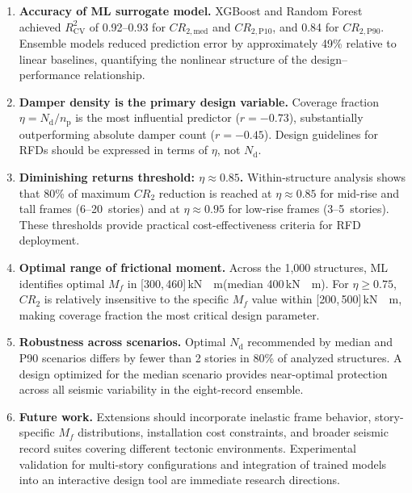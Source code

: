 \documentclass[preprint,12pt,authoryear]{elsarticle}
\newcommand{\CR}[1]{CR_{2,\text{#1}}}
\newcommand{\Rsq}{R^{2}_{\mathrm{CV}}}
\newcommand{\nd}{N_{\mathrm{d}}}
\newcommand{\np}{n_{\mathrm{p}}}              %
\newcommand{\etad}{\eta}
\newcommand{\Mf}{M_{\!f}}
\newcommand{\KM}{\,\si{kN{\cdot}m}}
\begin{document}
\begin{enumerate}

\item \textbf{Accuracy of ML surrogate model.}
XGBoost and Random Forest achieved $\Rsq$ of 0.92--0.93 for $\CR{med}$ and $\CR{P10}$,
and 0.84 for $\CR{P90}$. Ensemble models reduced prediction error by approximately 49\%
relative to linear baselines, quantifying the nonlinear structure of the
design--performance relationship.

\item \textbf{Damper density is the primary design variable.}
Coverage fraction $\etad = \nd/\np$ is the most influential predictor ($r = -0.73$),
substantially outperforming absolute damper count ($r = -0.45$). Design guidelines for
RFDs should be expressed in terms of $\etad$, not $\nd$.

\item \textbf{Diminishing returns threshold: $\etad \approx 0.85$.}
Within-structure analysis shows that 80\% of maximum $CR_2$ reduction is reached at
$\etad \approx 0.85$ for mid-rise and tall frames (6--20~stories) and at
$\etad \approx 0.95$ for low-rise frames (3--5~stories). These thresholds provide
practical cost-effectiveness criteria for RFD deployment.

\item \textbf{Optimal range of frictional moment.}
Across the 1,000 structures, ML identifies optimal $\Mf$ in [300,\,460]\KM (median
400\KM). For $\etad \geq 0.75$, $CR_2$ is relatively insensitive to the specific $\Mf$
value within [200,\,500]\KM, making coverage fraction the most critical design parameter.

\item \textbf{Robustness across scenarios.}
Optimal $\nd$ recommended by median and P90 scenarios differs by fewer than 2 stories in
80\% of analyzed structures. A design optimized for the median scenario provides
near-optimal protection across all seismic variability in the eight-record ensemble.

\item \textbf{Future work.}
Extensions should incorporate inelastic frame behavior, story-specific $\Mf$
distributions, installation cost constraints, and broader seismic record suites covering
different tectonic environments. Experimental validation for multi-story configurations
and integration of trained models into an interactive design tool are immediate research
directions.

\end{enumerate}



\end{document}
